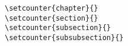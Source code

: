 \documentclass{book}%
\begin{document}

 





\verb|\setcounter{chapter}{|\verb|}|\\
\verb|\setcounter{section}{|\verb|}|\\
\verb|\setcounter{subsection}{|\verb|}|\\
\verb|\setcounter{subsubsection}{|\verb|}|



% 



 
\end{document}
